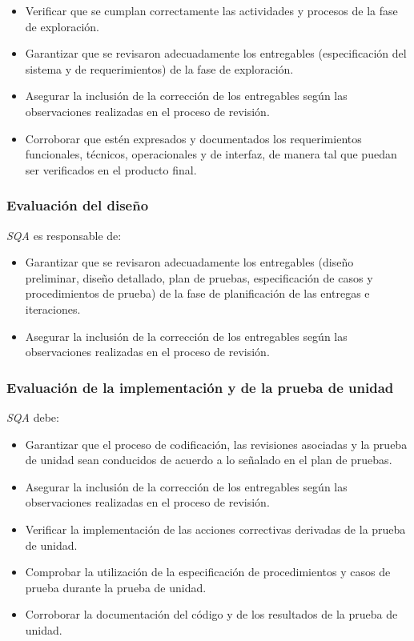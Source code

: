 	\begin{itemize}
		\item 
		Verificar que se cumplan correctamente las actividades y procesos de la fase de exploración.
		\item
		Garantizar que se revisaron adecuadamente los entregables (especificación del sistema y de requerimientos) de la fase de exploración. 
		\item
		Asegurar la inclusión de la corrección de los entregables según las observaciones realizadas en el proceso de revisión. 
		\item
		Corroborar que estén expresados y documentados los requerimientos funcionales, técnicos, operacionales y de interfaz, de manera tal que puedan ser verificados en el producto final.
	\end{itemize}

\subsubsection{Evaluación del diseño}

\textit{SQA} es responsable de:

	\begin{itemize}
		\item 
		Garantizar que se revisaron adecuadamente los entregables (diseño preliminar, diseño detallado, plan de pruebas, especificación de casos y procedimientos de prueba) de la fase de planificación de las entregas e iteraciones.
		\item
		Asegurar la inclusión de la corrección de los entregables según las observaciones realizadas en el proceso de revisión.
	\end{itemize}
	
\subsubsection{Evaluación de la implementación y de la prueba de unidad}

\textit{SQA} debe:

	\begin{itemize}
		\item 
		Garantizar que el proceso de codificación, las revisiones asociadas y la prueba de unidad sean conducidos de acuerdo a lo señalado en el plan de pruebas.
		\item
		Asegurar la inclusión de la corrección de los entregables según las observaciones realizadas en el proceso de revisión.
		\item
		Verificar la implementación de las acciones correctivas derivadas de la prueba de unidad.
		\item
		Comprobar la utilización de la especificación de procedimientos y casos de prueba durante la prueba de unidad. 
		\item
		Corroborar la documentación del código y de los resultados de la prueba de unidad.
	\end{itemize}

